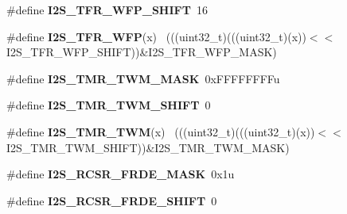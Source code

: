 \begin{DoxyCompactItemize}
\item 
\hypertarget{group___i2_s___register___masks_ga76c81603713aba769396b8c4921078c2}{}\#define {\bfseries I2\+S\+\_\+\+T\+F\+R\+\_\+\+W\+F\+P\+\_\+\+S\+H\+I\+F\+T}~16\label{group___i2_s___register___masks_ga76c81603713aba769396b8c4921078c2}

\item 
\hypertarget{group___i2_s___register___masks_gabf8afbeb83881164a854eaaee29eafa7}{}\#define {\bfseries I2\+S\+\_\+\+T\+F\+R\+\_\+\+W\+F\+P}(x)                                                  ~(((uint32\+\_\+t)(((uint32\+\_\+t)(x))$<$$<$I2\+S\+\_\+\+T\+F\+R\+\_\+\+W\+F\+P\+\_\+\+S\+H\+I\+F\+T))\&I2\+S\+\_\+\+T\+F\+R\+\_\+\+W\+F\+P\+\_\+\+M\+A\+S\+K)\label{group___i2_s___register___masks_gabf8afbeb83881164a854eaaee29eafa7}

\item 
\hypertarget{group___i2_s___register___masks_ga0c694ab6fec26ca6fc159fe1d8ccb591}{}\#define {\bfseries I2\+S\+\_\+\+T\+M\+R\+\_\+\+T\+W\+M\+\_\+\+M\+A\+S\+K}~0x\+F\+F\+F\+F\+F\+F\+F\+Fu\label{group___i2_s___register___masks_ga0c694ab6fec26ca6fc159fe1d8ccb591}

\item 
\hypertarget{group___i2_s___register___masks_ga50ccb20fbe6c1de252bfe8ffba29fb3e}{}\#define {\bfseries I2\+S\+\_\+\+T\+M\+R\+\_\+\+T\+W\+M\+\_\+\+S\+H\+I\+F\+T}~0\label{group___i2_s___register___masks_ga50ccb20fbe6c1de252bfe8ffba29fb3e}

\item 
\hypertarget{group___i2_s___register___masks_ga315984ee92e2beaca2c9faa4c824a8ae}{}\#define {\bfseries I2\+S\+\_\+\+T\+M\+R\+\_\+\+T\+W\+M}(x)                                                  ~(((uint32\+\_\+t)(((uint32\+\_\+t)(x))$<$$<$I2\+S\+\_\+\+T\+M\+R\+\_\+\+T\+W\+M\+\_\+\+S\+H\+I\+F\+T))\&I2\+S\+\_\+\+T\+M\+R\+\_\+\+T\+W\+M\+\_\+\+M\+A\+S\+K)\label{group___i2_s___register___masks_ga315984ee92e2beaca2c9faa4c824a8ae}

\item 
\hypertarget{group___i2_s___register___masks_gaf82cfc347ee6a04baec92ebf5198b06c}{}\#define {\bfseries I2\+S\+\_\+\+R\+C\+S\+R\+\_\+\+F\+R\+D\+E\+\_\+\+M\+A\+S\+K}~0x1u\label{group___i2_s___register___masks_gaf82cfc347ee6a04baec92ebf5198b06c}

\item 
\hypertarget{group___i2_s___register___masks_ga989180bd00d082c32921f39944f70c01}{}\#define {\bfseries I2\+S\+\_\+\+R\+C\+S\+R\+\_\+\+F\+R\+D\+E\+\_\+\+S\+H\+I\+F\+T}~0\label{group___i2_s___register___masks_ga989180bd00d082c32921f39944f70c01}


\end{DoxyCompactItemize}
